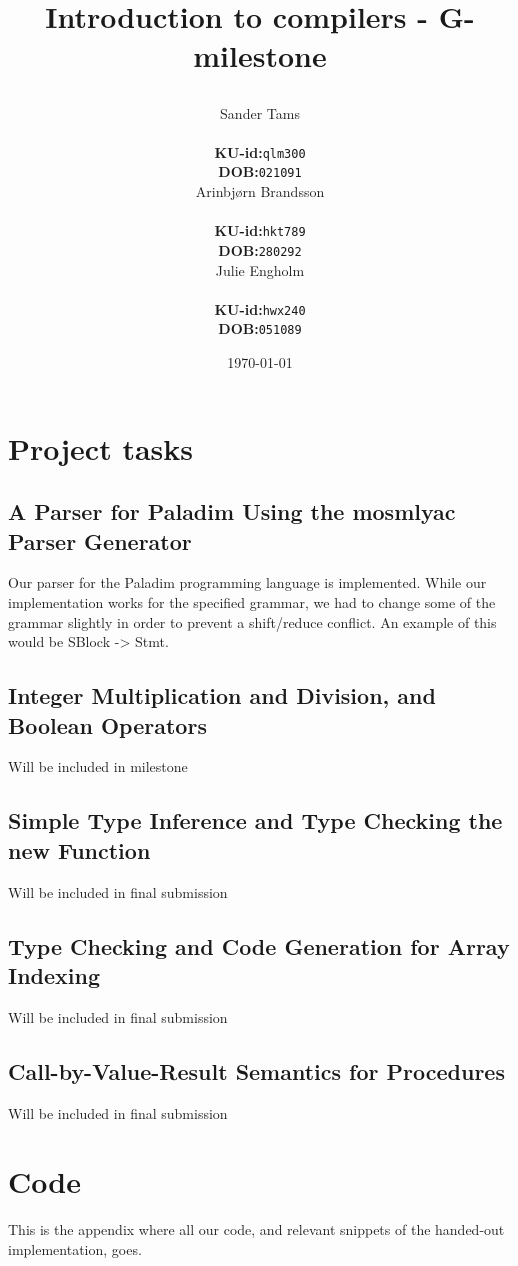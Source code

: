 \documentclass[11pt,a4paper,oneside,final]{article}
\title{%
    \vspace{2in}
    \begin{minipage}{\textwidth}
        \centering
        Introduction to compilers - G-milestone \\
    \end{minipage}
    \author{%
     \begin{minipage}{0.30\textwidth}
            \centering
            Sander Tams\\
            \begin{tabular}{l l}
                {\bf KU-id:}& {\tt qlm300}\\
                {\bf DOB:}  & {\tt 021091}
            \end{tabular}
        \end{minipage}
        \begin{minipage}{0.30\textwidth}
            \centering
            Arinbjørn Brandsson\\
            \begin{tabular}{l l}
                {\bf KU-id:}& {\tt hkt789}\\
                {\bf DOB:}  & {\tt 280292}
            \end{tabular}
        \end{minipage}
        \begin{minipage}{0.30\textwidth}
            \centering
            Julie Engholm\\
            \begin{tabular}{l l}
                {\bf KU-id:}& {\tt hwx240}\\
                {\bf DOB:}  & {\tt 051089}
            \end{tabular}
        \end{minipage}
    }
    \setcounter{page}{0}
    \date{\today}
}
\begin{document}
\maketitle
\thispagestyle{empty}
\newpage

\thispagestyle{psty:toc}
\tableofcontents
\setcounter{page}{0}
\newpage
\section{Project tasks}
\subsection{A Parser for Paladim Using the mosmlyac Parser Generator}

Our parser for the Paladim programming language is implemented. 
While our implementation works for the specified grammar, 
we had to change some of the grammar slightly in order to 
prevent a shift/reduce conflict. An example of this would be 
SBlock -> Stmt.

\subsection{Integer Multiplication and Division, and Boolean Operators}

Will be included in milestone

\subsection{Simple Type Inference and Type Checking the new Function}

Will be included in final submission

\subsection{Type Checking and Code Generation for Array Indexing}

Will be included in final submission

\subsection{Call-by-Value-Result Semantics for Procedures}

Will be included in final submission

\appendix
\section{Code}
This is the appendix where all our code, and relevant snippets of the handed-out implementation, goes.
\end{document}
